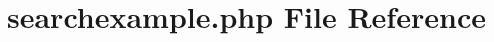 \hypertarget{searchexample_8php}{
\section{searchexample.php File Reference}
\label{searchexample_8php}
}
